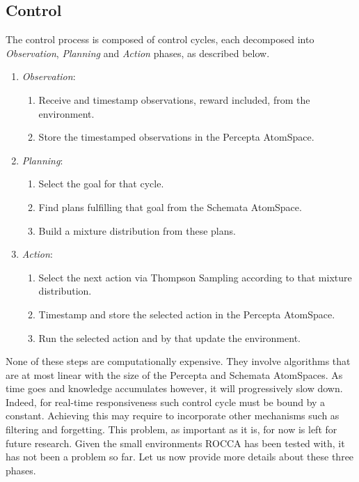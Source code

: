 \documentclass[runningheads]{llncs}
\begin{document}
\subsection{Control}
The control process is composed of control cycles, each decomposed
into \emph{Observation}, \emph{Planning} and \emph{Action} phases, as
described below.
\begin{enumerate}
\item \emph{Observation}:
  \begin{enumerate}
  \item Receive and timestamp observations, reward included, from the
    environment.
  \item Store the timestamped observations in the Percepta AtomSpace.
  \end{enumerate}
\item \emph{Planning}:
  \begin{enumerate}
  \item Select the goal for that cycle.
  \item Find plans fulfilling that goal from the Schemata AtomSpace.
  \item Build a mixture distribution from these plans.
  \end{enumerate}
\item \emph{Action}:
  \begin{enumerate}
  \item Select the next action via Thompson Sampling according to that
    mixture distribution.
  \item Timestamp and store the selected action in the Percepta
    AtomSpace.
  \item Run the selected action and by that update the environment.
  \end{enumerate}
\end{enumerate}
None of these steps are computationally expensive.  They involve
algorithms that are at most linear with the size of the Percepta and
Schemata AtomSpaces.  As time goes and knowledge accumulates however,
it will progressively slow down.  Indeed, for real-time responsiveness
such control cycle must be bound by a constant.  Achieving this may
require to incorporate other mechanisms such as filtering and
forgetting.  This problem, as important as it is, for now is left for
future research. %
Given the small environments ROCCA has
been tested with, it has not been a problem so far.
Let us now provide more details about these three phases.
\end{document}
